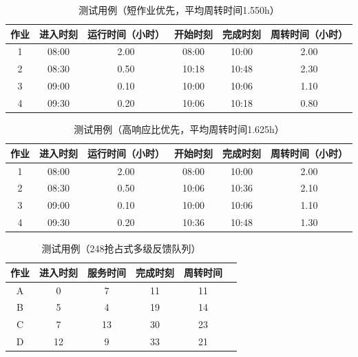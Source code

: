 \documentclass[UTF8]{ctexart}
\begin{document}
\begin{table}[htbp]
    \caption{测试用例（短作业优先，平均周转时间1.550h）}
    \centering
    \begin{tabular}{cccccc}
        \toprule
        作业 & 进入时刻 & 运行时间（小时） & 开始时刻 & 完成时刻 & 周转时间（小时） \\
        \midrule
        1    & 08:00    & 2.00             & 08:00    & 10:00    & 2.00             \\
        2    & 08:30    & 0.50             & 10:18    & 10:48    & 2.30             \\
        3    & 09:00    & 0.10             & 10:00    & 10:06    & 1.10             \\
        4    & 09:30    & 0.20             & 10:06    & 10:18    & 0.80             \\
        \bottomrule
    \end{tabular}
    \qquad
\end{table}

\begin{table}[htbp]
    \caption{测试用例（高响应比优先，平均周转时间1.625h）}
    \centering
    \begin{tabular}{cccccc}
        \toprule
        作业 & 进入时刻 & 运行时间（小时） & 开始时刻 & 完成时刻 & 周转时间（小时） \\
        \midrule
        1    & 08:00    & 2.00             & 08:00    & 10:00    & 2.00             \\
        2    & 08:30    & 0.50             & 10:06    & 10:36    & 2.10             \\
        3    & 09:00    & 0.10             & 10:00    & 10:06    & 1.10             \\
        4    & 09:30    & 0.20             & 10:36    & 10:48    & 1.30             \\
        \bottomrule
    \end{tabular}
    \qquad
\end{table}

\begin{table}[htbp]
    \caption{测试用例（248抢占式多级反馈队列）}
    \centering
    \begin{tabular}{cccccc}
        \toprule
        作业 & 进入时刻 & 服务时间 & 完成时刻 & 周转时间 \\
        \midrule
        A    & 0        & 7        & 11       & 11       \\
        B    & 5        & 4        & 19       & 14       \\
        C    & 7        & 13       & 30       & 23       \\
        D    & 12       & 9        & 33       & 21       \\
        \bottomrule
    \end{tabular}
    \qquad
\end{table}
\end{document}
